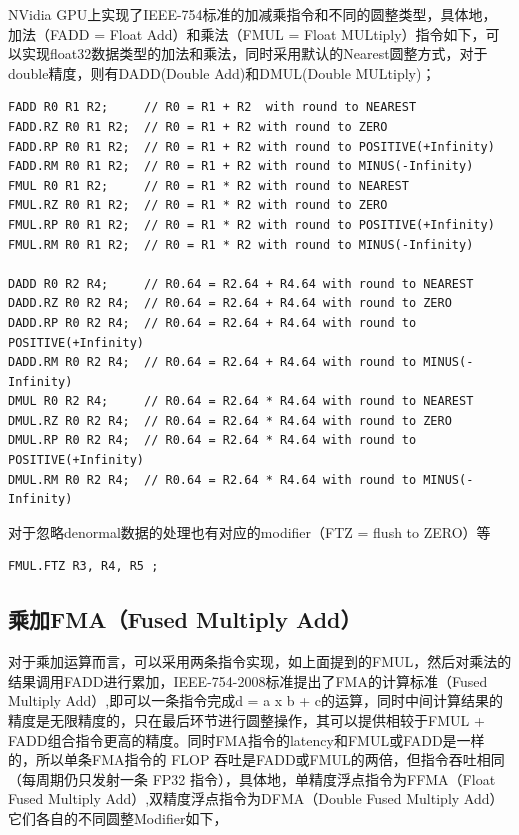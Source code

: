 NVidia GPU上实现了IEEE-754标准的加减乘指令和不同的圆整类型，具体地， 加法（FADD = Float Add）和乘法（FMUL = Float MULtiply）指令如下，可以实现float32数据类型的加法和乘法，同时采用默认的Nearest圆整方式，对于double精度，则有DADD(Double Add)和DMUL(Double MULtiply)；

\begin{lstlisting}
FADD R0 R1 R2;     // R0 = R1 + R2  with round to NEAREST
FADD.RZ R0 R1 R2;  // R0 = R1 + R2 with round to ZERO
FADD.RP R0 R1 R2;  // R0 = R1 + R2 with round to POSITIVE(+Infinity)
FADD.RM R0 R1 R2;  // R0 = R1 + R2 with round to MINUS(-Infinity)
FMUL R0 R1 R2;     // R0 = R1 * R2 with round to NEAREST
FMUL.RZ R0 R1 R2;  // R0 = R1 * R2 with round to ZERO
FMUL.RP R0 R1 R2;  // R0 = R1 * R2 with round to POSITIVE(+Infinity)
FMUL.RM R0 R1 R2;  // R0 = R1 * R2 with round to MINUS(-Infinity)

DADD R0 R2 R4;     // R0.64 = R2.64 + R4.64 with round to NEAREST
DADD.RZ R0 R2 R4;  // R0.64 = R2.64 + R4.64 with round to ZERO
DADD.RP R0 R2 R4;  // R0.64 = R2.64 + R4.64 with round to POSITIVE(+Infinity)
DADD.RM R0 R2 R4;  // R0.64 = R2.64 + R4.64 with round to MINUS(-Infinity)
DMUL R0 R2 R4;     // R0.64 = R2.64 * R4.64 with round to NEAREST
DMUL.RZ R0 R2 R4;  // R0.64 = R2.64 * R4.64 with round to ZERO
DMUL.RP R0 R2 R4;  // R0.64 = R2.64 * R4.64 with round to POSITIVE(+Infinity)
DMUL.RM R0 R2 R4;  // R0.64 = R2.64 * R4.64 with round to MINUS(-Infinity)
\end{lstlisting}

对于忽略denormal数据的处理也有对应的modifier（FTZ = flush to ZERO）等

\begin{lstlisting}
FMUL.FTZ R3, R4, R5 ;
\end{lstlisting}

\subsection{乘加FMA（Fused Multiply Add）}

对于乘加运算而言，可以采用两条指令实现，如上面提到的FMUL，然后对乘法的结果调用FADD进行累加，IEEE-754-2008标准提出了FMA的计算标准（Fused Multiply Add）,即可以一条指令完成d = a x b + c的运算，同时中间计算结果的精度是无限精度的，只在最后环节进行圆整操作，其可以提供相较于FMUL + FADD组合指令更高的精度。同时FMA指令的latency和FMUL或FADD是一样的，所以单条FMA指令的 FLOP 吞吐是FADD或FMUL的两倍，但指令吞吐相同（每周期仍只发射一条 FP32 指令），具体地，单精度浮点指令为FFMA（Float Fused Multiply Add）,双精度浮点指令为DFMA（Double Fused Multiply Add）它们各自的不同圆整Modifier如下，

